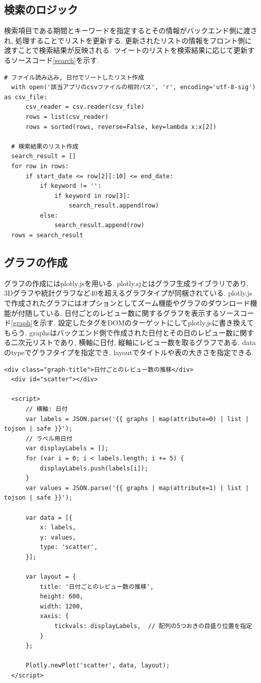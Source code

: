 \subsection{検索のロジック}
検索項目である期間とキーワードを指定するとその情報がバックエンド側に渡され, 処理することでリストを更新する. 更新されたリストの情報をフロント側に渡すことで検索結果が反映される. 
ツイートのリストを検索結果に応じて更新するソースコード\ref{search}を示す. 

\begin{lstlisting}[caption=view.py, label=search]
  # ファイル読み込み, 日付でソートしたリスト作成
  with open('該当アプリのcsvファイルの相対パス', 'r', encoding='utf-8-sig') as csv_file:
      csv_reader = csv.reader(csv_file)
      rows = list(csv_reader)
      rows = sorted(rows, reverse=False, key=lambda x:x[2])

  # 検索結果のリスト作成
  search_result = []
  for row in rows:
      if start_date <= row[2][:10] <= end_date:
          if keyword != '':
              if keyword in row[3]:
                  search_result.append(row)
          else:
              search_result.append(row)
  rows = search_result
\end{lstlisting}

\subsection{グラフの作成}
グラフの作成にはplotly.js\cite{plotly}を用いる. plotly.sjとはグラフ生成ライブラリであり, 3Dグラフや統計グラフなど40を超えるグラフタイプが同梱されている\cite{plotly}.
plotly.jsで作成されたグラフにはオプションとしてズーム機能やグラフのダウンロード機能が付随している. 
日付ごとのレビュー数に関するグラフを表示するソースコード\ref{graph}を示す. 設定したタグをDOMのターゲットにしてplotly.jsに書き換えてもらう. graphsはバックエンド側で作成された日付とその日のレビュー数に関する二次元リストであり, 横軸に日付, 縦軸にレビュー数を取るグラフである. 
dataのtypeでグラフタイプを指定でき, layoutでタイトルや表の大きさを指定できる. 

\begin{lstlisting}[caption=detail.html, label=graph]
  <div class="graph-title">日付ごとのレビュー数の推移</div>
  <div id="scatter"></div>

  <script>
      // 横軸: 日付
      var labels = JSON.parse('{{ graphs | map(attribute=0) | list | tojson | safe }}');
      // ラベル用日付
      var displayLabels = [];
      for (var i = 0; i < labels.length; i += 5) {
          displayLabels.push(labels[i]);
      }
      var values = JSON.parse('{{ graphs | map(attribute=1) | list | tojson | safe }}');

      var data = [{
          x: labels,
          y: values,
          type: 'scatter',
      }];

      var layout = {
          title: '日付ごとのレビュー数の推移',
          height: 600,
          width: 1200,
          xaxis: {
              tickvals: displayLabels,  // 配列の5つおきの目盛り位置を指定
          }
      };

      Plotly.newPlot('scatter', data, layout);
  </script>
\end{lstlisting}
